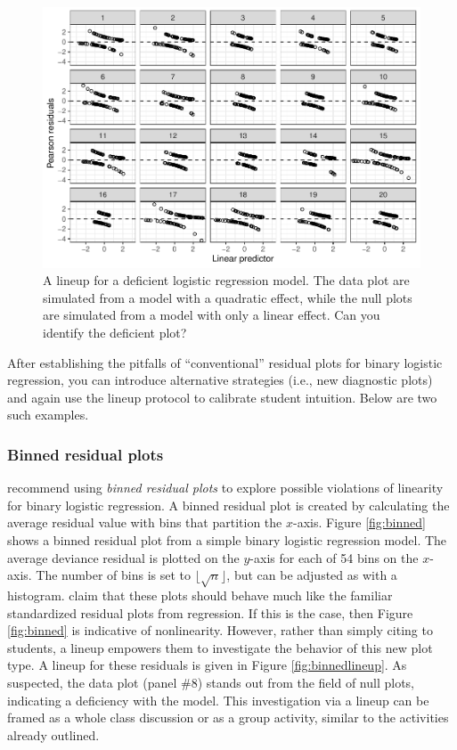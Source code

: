 \documentclass[12pt]{article}
\begin{document}
\begin{figure}
\centering
\includegraphics{logistic_residuals_bad.pdf}
\caption{\label{fig:logisticissue} A lineup for a deficient logistic
regression model. The data plot are simulated from a model with a
quadratic effect, while the null plots are simulated from a model with
only a linear effect. Can you identify the deficient plot?}
\end{figure}

After establishing the pitfalls of ``conventional'' residual plots for
binary logistic regression, you can introduce alternative strategies
(i.e., new diagnostic plots) and again use the lineup protocol to
calibrate student intuition. Below are two such examples.

\hypertarget{binned-residual-plots}{%
\subsubsection{Binned residual plots}\label{binned-residual-plots}}

\citet{GelmanHill:2007} recommend using \emph{binned residual plots} to
explore possible violations of linearity for binary logistic regression.
A binned residual plot is created by calculating the average residual
value with bins that partition the \(x\)-axis. Figure \ref{fig:binned}
shows a binned residual plot from a simple binary logistic regression
model. The average deviance residual is plotted on the \(y\)-axis for
each of 54 bins on the \(x\)-axis. The number of bins is set to
\(\lfloor \sqrt{n} \rfloor\), but can be adjusted as with a histogram.
\citet{GelmanHill:2007} claim that these plots should behave much like
the familiar standardized residual plots from regression. If this is the
case, then Figure \ref{fig:binned} is indicative of nonlinearity.
However, rather than simply citing \citet{GelmanHill:2007} to students,
a lineup empowers them to investigate the behavior of this new plot
type. A lineup for these residuals is given in Figure
\ref{fig:binnedlineup}. As suspected, the data plot (panel \#8) stands
out from the field of null plots, indicating a deficiency with the
model. This investigation via a lineup can be framed as a whole class
discussion or as a group activity, similar to the activities already
outlined.
\end{document}
